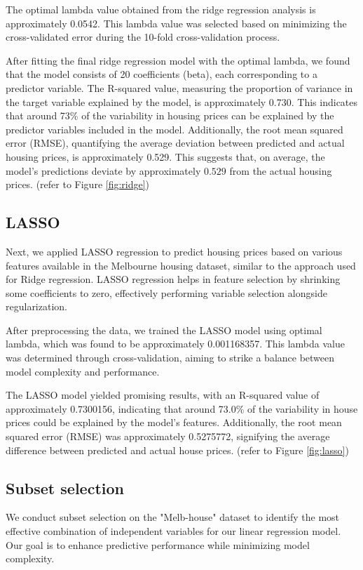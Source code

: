 \documentclass[12pt,doublespace]{article}
\begin{document}
	The optimal lambda value obtained from the ridge regression analysis is approximately 0.0542. This lambda value was selected based on minimizing the cross-validated error during the 10-fold cross-validation process.
	
	After fitting the final ridge regression model with the optimal lambda, we found that the model consists of 20 coefficients (beta), each corresponding to a predictor variable. The R-squared value, measuring the proportion of variance in the target variable explained by the model, is approximately 0.730. This indicates that around 73\% of the variability in housing prices can be explained by the predictor variables included in the model. Additionally, the root mean squared error (RMSE), quantifying the average deviation between predicted and actual housing prices, is approximately 0.529. This suggests that, on average, the model's predictions deviate by approximately $0.529$ from the actual housing prices. (refer to Figure \ref{fig:ridge})
		
	\subsection{LASSO}
	
	Next, we applied LASSO regression to predict housing prices based on various features available in the Melbourne housing dataset, similar to the approach used for Ridge regression. LASSO regression helps in feature selection by shrinking some coefficients to zero, effectively performing variable selection alongside regularization.
	
	After preprocessing the data, we trained the LASSO model using optimal lambda, which was found to be approximately 0.001168357. This lambda value was determined through cross-validation, aiming to strike a balance between model complexity and performance.
	
	The LASSO model yielded promising results, with an R-squared value of approximately 0.7300156, indicating that around 73.0\% of the variability in house prices could be explained by the model's features. Additionally, the root mean squared error (RMSE) was approximately 0.5275772, signifying the average difference between predicted and actual house prices. (refer to Figure \ref{fig:lasso})
	
		\subsection{Subset selection}
	We conduct subset selection on the "Melb-house" dataset to identify the most effective combination of independent variables for our linear regression model. Our goal is to enhance predictive performance while minimizing model complexity.
	
\end{document}
